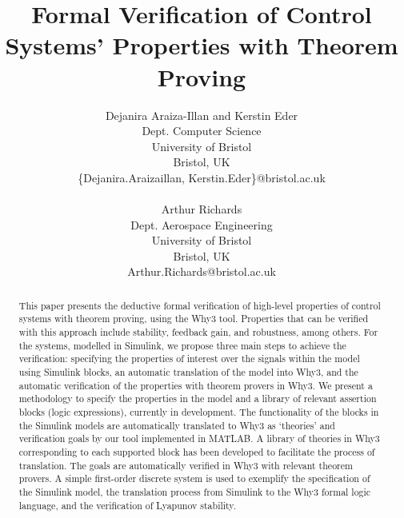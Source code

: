 \documentclass[a4paper]{article}
\begin{document}
\title{Formal Verification of Control Systems' Properties with Theorem Proving}



\author{Dejanira Araiza-Illan and Kerstin Eder\\Dept. Computer Science\\University of Bristol\\
Bristol, UK \\\{Dejanira.Araizaillan, Kerstin.Eder\}@bristol.ac.uk\\\\
Arthur Richards\\Dept. Aerospace Engineering\\University of Bristol\\
Bristol, UK\\Arthur.Richards@bristol.ac.uk}
\date{}

\maketitle


\begin{abstract}
This paper presents the deductive formal verification of high-level properties of control systems with theorem proving, using the Why3 tool. Properties that can be verified with this approach include stability, feedback gain, and robustness, among others. For the systems, modelled in Simulink, we propose three main steps to achieve the verification: specifying the properties of interest over the signals within the model using Simulink blocks, an automatic translation of the model into Why3, and the automatic verification of the properties with theorem provers in Why3. We present a methodology to specify the properties in the model and a library of relevant assertion blocks (logic expressions), currently in development. The functionality of the blocks in the Simulink models are automatically translated to Why3 as `theories' and verification goals by our tool implemented in MATLAB. A library of theories in Why3 corresponding to each supported block has been developed to facilitate the process of translation. The goals are automatically verified in Why3 with relevant theorem provers. A simple first-order discrete system is used to exemplify the specification of the Simulink model, the translation process from Simulink to the Why3 formal logic language, and the verification of Lyapunov stability.
\end{abstract}
\end{document}
